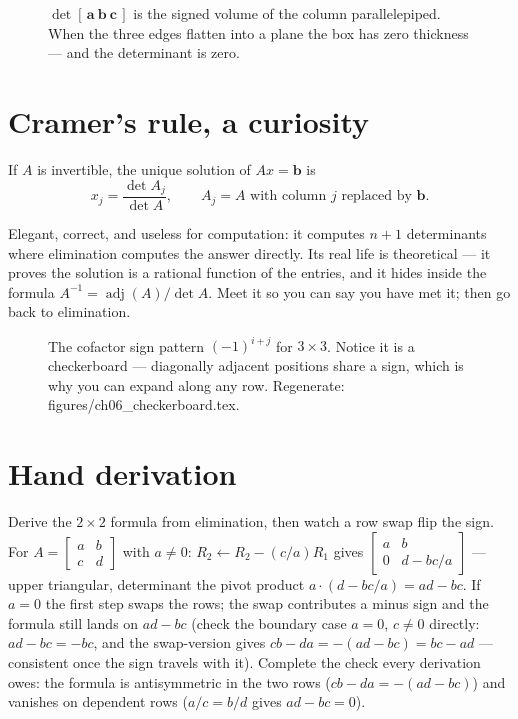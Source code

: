 \begin{figure}[htbp]\centering

\caption{$\det[\,\mathbf a\ \mathbf b\ \mathbf c\,]$ is the signed
volume of the column parallelepiped. When the three edges flatten into
a plane the box has zero thickness --- and the determinant is zero.}
\label{fig:box}
\end{figure}

\section{Cramer's rule, a curiosity}\label{sec:det-cramer}

\begin{theorem}
If $A$ is invertible, the unique solution of $Ax=\mathbf b$ is
\[
x_j=\frac{\det A_j}{\det A},
\qquad
A_j=\text{$A$ with column $j$ replaced by $\mathbf b$}.
\]
\end{theorem}

Elegant, correct, and useless for computation: it computes $n+1$
determinants where elimination computes the answer directly. Its real
life is theoretical --- it proves the solution is a rational function of
the entries, and it hides inside the formula
$A^{-1}=\operatorname{adj}(A)/\det A$. Meet it so you can say you have met
it; then go back to elimination.

\begin{figure}[htbp]
\centering

\caption{The cofactor sign pattern $(-1)^{i+j}$ for $3\times3$. Notice it
is a checkerboard --- diagonally adjacent positions share a sign, which is
why you can expand along any row. Regenerate:
\ttfamily figures/ch06\_checkerboard.tex.}
\label{fig:det-checker}
\end{figure}

\section{Hand derivation}\label{sec:handderiv6}

Derive the $2\times2$ formula from elimination, then watch a row swap flip
the sign. For $A=\begin{bmatrix}a&b\\c&d\end{bmatrix}$ with $a\ne0$:
$R_2\leftarrow R_2-(c/a)R_1$ gives
$\begin{bmatrix}a&b\\0&d-bc/a\end{bmatrix}$ --- upper triangular,
determinant the pivot product $a\cdot(d-bc/a)=ad-bc$. If $a=0$ the first
step swaps the rows; the swap contributes a minus sign and the formula
still lands on $ad-bc$ (check the boundary case $a=0$, $c\ne0$
directly: $ad-bc=-bc$, and the swap-version gives
$cb-da=-(ad-bc)=bc-ad$ --- consistent once the sign travels with it).
Complete the check every derivation owes: the formula is antisymmetric in
the two rows ($cb-da=-(ad-bc)$) and vanishes on dependent rows
($a/c=b/d$ gives $ad-bc=0$).

